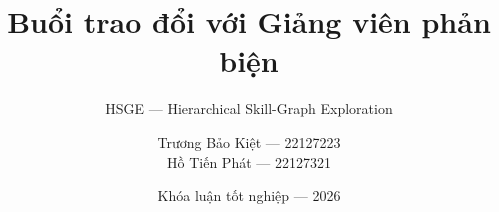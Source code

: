 \title[HSGE --- Trao đổi phản biện]{Buổi trao đổi với Giảng viên phản biện}
\subtitle{HSGE --- Hierarchical Skill-Graph Exploration}

\author[Bảo Kiệt --- Tiến Phát]{
  \texorpdfstring{Trương Bảo Kiệt --- 22127223 \\ Hồ Tiến Phát --- 22127321}{Trương Bảo Kiệt, Hồ Tiến Phát}
}


\date{Khóa luận tốt nghiệp --- 2026}
